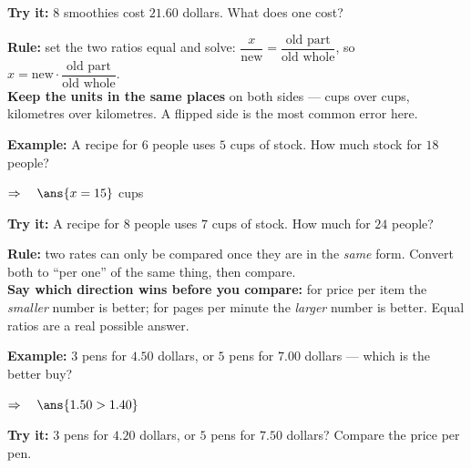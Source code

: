 \documentclass[12pt]{article}
\begin{document}
\begin{tryitbox}
\textbf{Try it:} $8$ smoothies cost $21.60$ dollars. What does one cost?\\[2pt]
\end{tryitbox}


\begin{formulabox}
\textbf{Rule:} set the two ratios equal and solve:
$\dfrac{x}{\text{new}} = \dfrac{\text{old part}}{\text{old whole}}$, so
$x = \text{new} \cdot \dfrac{\text{old part}}{\text{old whole}}$.\\[3pt]
\textbf{Keep the units in the same places} on both sides --- cups over cups,
kilometres over kilometres. A flipped side is the most common error here.
\end{formulabox}

\begin{examplebox}
\textbf{Example:} A recipe for $6$ people uses $5$ cups of stock. How much
stock for $18$ people?

$\Rightarrow\quad \ans{x = 15}$ cups
\end{examplebox}

\begin{tryitbox}
\textbf{Try it:} A recipe for $8$ people uses $7$ cups of stock. How much for
$24$ people?\\[2pt]
\end{tryitbox}


\begin{formulabox}
\textbf{Rule:} two rates can only be compared once they are in the \emph{same}
form. Convert both to ``per one'' of the same thing, then compare.\\[3pt]
\textbf{Say which direction wins before you compare:} for price per item the
\emph{smaller} number is better; for pages per minute the \emph{larger} number
is better. Equal ratios are a real possible answer.
\end{formulabox}

\begin{examplebox}
\textbf{Example:} $3$ pens for $4.50$ dollars, or $5$ pens for $7.00$ dollars
--- which is the better buy?

$\Rightarrow\quad \ans{1.50 > 1.40}$
\end{examplebox}

\begin{tryitbox}
\textbf{Try it:} $3$ pens for $4.20$ dollars, or $5$ pens for $7.50$ dollars?
Compare the price per pen.\\[2pt]
\end{tryitbox}
\end{document}
